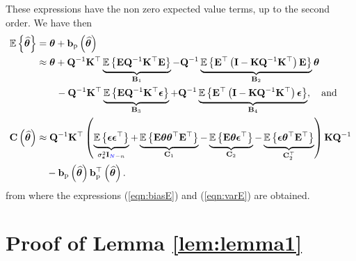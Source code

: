 These expressions have the non zero expected value terms, up to the second order. 
We have then
\begin{equation} \begin{aligned} \mathbb{E} \left\{ \widehat{\bm{\theta}} \right\} & = \bm{\theta} + \mathbf{b}_{\mathrm{p}} \left( \widehat{\bm{\theta}} \right) \\
& \approx \bm{\theta}  +  \mathbf{Q}^{-1} \mathbf{K}^\top \underbrace{\mathbb{E} \left\{ \mathbf{E} \mathbf{Q}^{-1} \mathbf{K}^\top \mathbf{E} \right\}}_{\mathbf{B}_1} - \mathbf{Q}^{-1} \underbrace{\mathbb{E} \left\{ \mathbf{E}^\top \left( \mathbf{I} - \mathbf{K} \mathbf{Q}^{-1} \mathbf{K}^\top \right) \mathbf{E} \right\}}_{\mathbf{B}_2} \bm{\theta} \\ 
& \quad \ \ \ - \mathbf{Q}^{-1} \mathbf{K}^\top \underbrace{\mathbb{E} \left\{ \mathbf{E} \mathbf{Q}^{-1} \mathbf{K}^\top \bm{\epsilon} \right\}}_{\mathbf{B}_3} + \mathbf{Q}^{-1} \underbrace{\mathbb{E} \left\{ \mathbf{E}^\top \left( \mathbf{I} - \mathbf{K} \mathbf{Q}^{-1} \mathbf{K}^\top \right) \bm{\epsilon} \right\}}_{\mathbf{B}_4} , \quad \text{and} \\ 
\mathbf{C} \left( \widehat{\bm{\theta}} \right)  & \approx \mathbf{Q}^{-1} \mathbf{K}^\top \left( \underbrace{\mathbb{E} \left\{ \bm{\epsilon} \bm{\epsilon}^\top \right\}}_{\sigma_{\bm{\epsilon}}^2 \mathbf{I}_{\color{blue}N\color{black}-n}}  + \underbrace{\mathbb{E} \left\{ \mathbf{E} \bm{\theta} \bm{\theta}^\top \mathbf{E}^\top \right\}}_{\mathbf{C}_1}  - \underbrace{\mathbb{E} \left\{  \mathbf{E} \bm{\theta} \bm{\epsilon}^\top \right\}}_{\mathbf{C}_2} - \underbrace{\mathbb{E} \left\{ \bm{\epsilon} \bm{\theta}^\top \mathbf{E}^\top \right\}}_{\mathbf{C}_2^\top} \right) \mathbf{K} \mathbf{Q}^{-1} \\
& \quad - \mathbf{b}_{\mathrm{p}} \left( \widehat{\bm{\theta}} \right) \mathbf{b}_{\mathrm{p}}^\top \left( \widehat{\bm{\theta}} \right). \end{aligned} \end{equation} 
from where the expressions (\ref{eqn:biasE}) and (\ref{eqn:varE}) are obtained.



\section{Proof of Lemma \ref{lem:lemma1} \label{appendix:lemma1} } 

